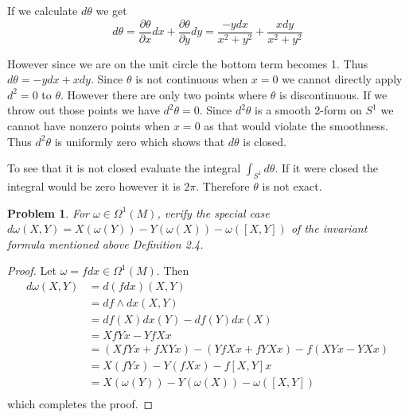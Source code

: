 \documentclass[10pt]{article}
\theoremstyle{plain}
\newtheorem{problem}{Problem}
\theoremstyle{remark}
\begin{document}
If we calculate $d\theta$ we get
\[
  d\theta = \frac{\partial \theta}{\partial x}dx+\frac{\partial\theta}{\partial y}dy = \frac{-ydx}{x^2+y^2} + \frac{xdy}{x^2+y^2}
\]

However since we are on the unit circle the bottom term becomes 1. Thus
$d\theta=-ydx+xdy$. Since $\theta$ is not continuous when $x=0$ we cannot directly
apply $d^2=0$ to $\theta$. However there are only two points where $\theta$ is
discontinuous. If we throw out those points we have $d^2\theta=0$. Since
$d^2\theta$ is a smooth 2-form on $S^1$ we cannot have nonzero points when
$x=0$ as that would violate the smoothness. Thus $d^2\theta$ is uniformly
zero which shows that $d\theta$ is closed.

To see that it is not closed evaluate the integral $\int_{S^1}d\theta$. If it
were closed the integral would be zero however it is $2\pi$. Therefore
$\theta$ is not exact.

\pagebreak

\begin{problem}
  For $\omega\in\Omega^1(M)$, verify the special case
  $d\omega(X,Y)=X(\omega(Y))-Y(\omega(X))-\omega([X,Y])$ of the invariant
  formula mentioned above Definition 2.4.
\end{problem}

\begin{proof}
  Let $\omega=fdx\in\Omega^1(M)$. Then
  \begin{align*}
    d\omega(X,Y) &= d(fdx)(X,Y) \\
            &= df\wedge dx(X,Y) \\
            &= df(X)dx(Y)-df(Y)dx(X) \\
            &= XfYx-YfXx \\
            &= (XfYx+fXYx)-(YfXx+fYXx)-f(XYx-YXx) \\
            &= X(fYx)-Y(fXx)-f[X,Y]x \\
            &= X(\omega(Y))-Y(\omega(X))-\omega([X,Y])\\
  \end{align*}
  which completes the proof.
\end{proof}

\end{document}

